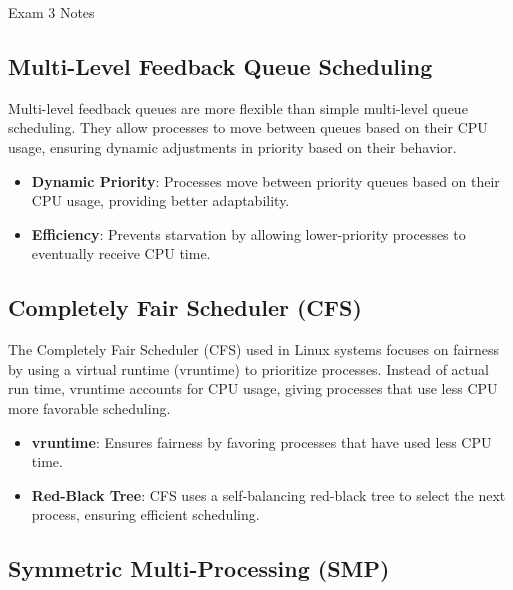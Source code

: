 \begin{examnotes}{Exam 3 Notes}
    \subsection*{Multi-Level Feedback Queue Scheduling}
    
    Multi-level feedback queues are more flexible than simple multi-level queue scheduling. They allow processes to move between queues based on their CPU usage, ensuring dynamic adjustments in priority based on their behavior.
    
    \begin{highlight}
        \begin{itemize}
            \item \textbf{Dynamic Priority}: Processes move between priority queues based on their CPU usage, providing better adaptability.
            \item \textbf{Efficiency}: Prevents starvation by allowing lower-priority processes to eventually receive CPU time.
        \end{itemize}
    \end{highlight}
    
    \subsection*{Completely Fair Scheduler (CFS)}
    
    The Completely Fair Scheduler (CFS) used in Linux systems focuses on fairness by using a virtual runtime (vruntime) to prioritize processes. Instead of actual run time, vruntime accounts for CPU usage, giving processes that use less CPU more favorable scheduling.
    
    \begin{highlight}
        \begin{itemize}
            \item \textbf{vruntime}: Ensures fairness by favoring processes that have used less CPU time.
            \item \textbf{Red-Black Tree}: CFS uses a self-balancing red-black tree to select the next process, ensuring efficient scheduling.
        \end{itemize}
    \end{highlight}
    
    \subsection*{Symmetric Multi-Processing (SMP)}
    

\end{examnotes}
